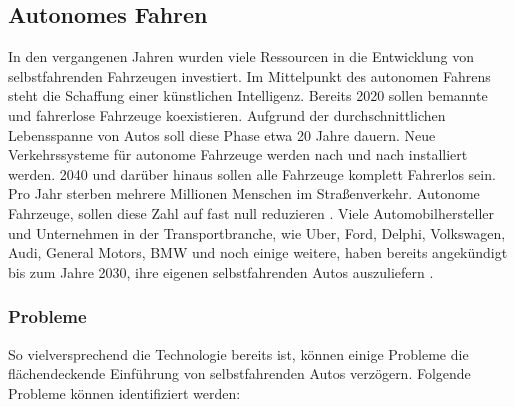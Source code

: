 \documentclass{sigchi}
\begin{document}
\subsection{Autonomes Fahren}
In den vergangenen Jahren wurden viele Ressourcen in die Entwicklung von selbstfahrenden Fahrzeugen investiert. Im Mittelpunkt des autonomen Fahrens steht die Schaffung einer künstlichen Intelligenz. Bereits 2020 sollen bemannte und fahrerlose Fahrzeuge koexistieren. Aufgrund der durchschnittlichen Lebensspanne von Autos soll diese Phase etwa 20 Jahre dauern. Neue Verkehrssysteme für autonome Fahrzeuge werden nach und nach installiert werden. 2040 und darüber hinaus sollen alle Fahrzeuge komplett Fahrerlos sein. Pro Jahr sterben mehrere Millionen Menschen im Straßenverkehr. Autonome Fahrzeuge, sollen diese Zahl auf fast null reduzieren \cite{drive-my-car:2017}. Viele Automobilhersteller und Unternehmen in der Transportbranche, wie Uber, Ford, Delphi, Volkswagen, Audi, General Motors, BMW und noch einige weitere, haben bereits angekündigt bis zum Jahre 2030, ihre eigenen selbstfahrenden Autos auszuliefern \cite{driverless-future:2016}.

\subsubsection{Probleme}
So vielversprechend die Technologie bereits ist, können einige Probleme die flächendeckende Einführung von selbstfahrenden Autos verzögern. Folgende Probleme können identifiziert werden:
\end{document}

